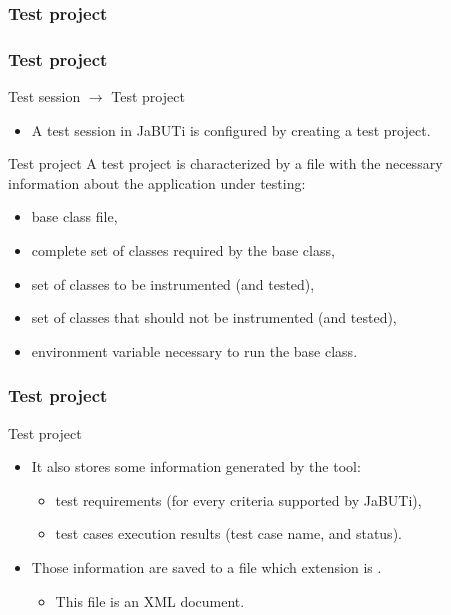 \begin{frame}[c,parent={cmap:jabuti-software-testing},hasnext=true,hasprev=false]
\label{cmap:jabuti-test-project}
\label{cmap:test-project}
\frametitle{Test project}

\end{frame}


\begin{frame}[parent={cmap:jabuti-test-project},hasnext=true,hasprev=true]
\label{concept:test-project}
\frametitle{Test project}

\begin{block:fact}{Test session $\rightarrow$ Test project}
\begin{itemize}
	\item A test session in JaBUTi is configured by creating a test project.
\end{itemize}
\end{block:fact}

\begin{block:concept}{Test project}
A test project is characterized by a file with the necessary information
about the application under testing:
\begin{itemize}
	\item<3-> base class file,
	\item<4-> complete set of classes required by the base class,
	\item<5-> set of classes to be instrumented (and tested),
	\item<6-> set of classes that should not be instrumented (and tested),
	\item<7->  environment variable necessary to run
	the base class.
\end{itemize}
\end{block:concept}
\end{frame}



\begin{frame}
\frametitle{Test project}

\begin{block:concept}{Test project}
\begin{itemize}
	\item<1-> It also stores some information generated by the tool:
	\begin{itemize}
		\item test requirements (for every criteria supported by JaBUTi),

		\item test cases execution results (test case name, and status).
	\end{itemize}

	\item<2-> Those information are saved to a file which extension is
	.
	\begin{itemize}
		\item This file is an XML document.
	\end{itemize}
\end{itemize}
\end{block:concept}
\end{frame}
